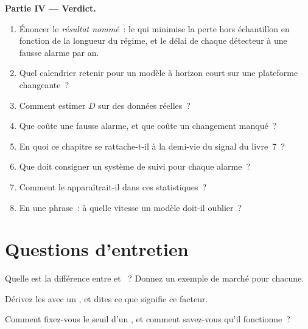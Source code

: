 \begin{problem}
\medskip\noindent\textbf{Partie IV --- Verdict.}
\begin{enumerate}[resume]
\item Énoncer le \emph{résultat nommé}~: le  qui minimise la perte hors échantillon en fonction de la
longueur du régime, et le délai de chaque détecteur à une fausse alarme par an.
\item Quel calendrier retenir pour un modèle à horizon court sur une plateforme changeante~?
\item Comment estimer $D$ sur des données réelles~?
\item Que coûte une fausse alarme, et que coûte un changement manqué~?
\item En quoi ce chapitre se rattache-t-il à la demi-vie du signal du livre~7~?
\item Que doit consigner un système de suivi pour chaque alarme~?
\item Comment le  apparaîtrait-il dans ces statistiques~?
\item En une phrase~: à quelle vitesse un modèle doit-il oublier~?
\end{enumerate}
\end{problem}

\section{Questions d'entretien}

\begin{interviewq}\label{iq:ml:online-learning-and-drift:1}
Quelle est la différence entre  et ~? Donnez un exemple de marché pour chacune.
\end{interviewq}

\begin{interviewq}\label{iq:ml:online-learning-and-drift:2}
Dérivez les  avec un , et dites ce que signifie ce facteur.
\end{interviewq}

\begin{interviewq}\label{iq:ml:online-learning-and-drift:3}
Comment fixez-vous le seuil d'un , et comment savez-vous qu'il fonctionne~?
\end{interviewq}

